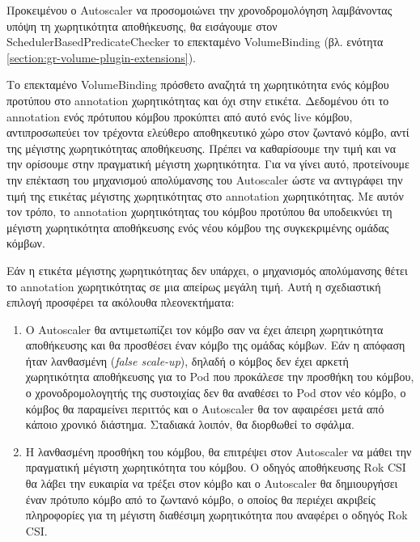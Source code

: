 Προκειμένου ο Autoscaler να προσομοιώνει την χρονοδρομολόγηση λαμβάνοντας υπόψη
τη χωρητικότητα αποθήκευσης,  θα εισάγουμε στον SchedulerBasedPredicateChecker
το επεκταμένο VolumeBinding (βλ. ενότητα
\ref*{section:gr-volume-plugin-extensions}).


Το επεκταμένο VolumeBinding  πρόσθετο αναζητά τη χωρητικότητα ενός κόμβου
προτύπου στο annotation χωρητικότητας και όχι στην ετικέτα. Δεδομένου ότι το
annotation ενός πρότυπου κόμβου προκύπτει από αυτό ενός live κόμβου,
αντιπροσωπεύει τον τρέχοντα ελεύθερο αποθηκευτικό χώρο στον ζωντανό κόμβο, αντί
της μέγιστης χωρητικότητας αποθήκευσης. Πρέπει να καθαρίσουμε την τιμή και να
την ορίσουμε στην πραγματική μέγιστη χωρητικότητα. Για να γίνει αυτό,
προτείνουμε την επέκταση του μηχανισμού απολύμανσης του Autoscaler ώστε να αντιγράφει
την τιμή της ετικέτας μέγιστης χωρητικότητας στο annotation χωρητικότητας. Με
αυτόν τον τρόπο, το annotation χωρητικότητας του κόμβου προτύπου θα
υποδεικνύει τη μέγιστη χωρητικότητα αποθήκευσης ενός νέου κόμβου της
συγκεκριμένης ομάδας κόμβων.

Εάν η ετικέτα μέγιστης χωρητικότητας δεν υπάρχει, ο μηχανισμός απολύμανσης θέτει
το annotation χωρητικότητας σε μια απείρως μεγάλη τιμή. Αυτή η σχεδιαστική
επιλογή προσφέρει τα ακόλουθα πλεονεκτήματα:
\begin{enumerate}
      \item Ο Autoscaler θα αντιμετωπίζει τον κόμβο σαν να έχει άπειρη χωρητικότητα
            αποθήκευσης και θα προσθέσει έναν κόμβο της ομάδας κόμβων. Εάν η
            απόφαση ήταν λανθασμένη (\textit{false scale-up}), δηλαδή ο κόμβος
            δεν έχει αρκετή χωρητικότητα αποθήκευσης για το Pod που
            προκάλεσε την προσθήκη του κόμβου, ο χρονοδρομολογητής της συστοιχίας
            δεν θα αναθέσει το Pod στον νέο κόμβο, ο κόμβος θα παραμείνει
            περιττός και ο Autoscaler θα τον αφαιρέσει μετά από κάποιο χρονικό
            διάστημα. Σταδιακά λοιπόν, θα διορθωθεί το σφάλμα.
      \item Η λανθασμένη προσθήκη του κόμβου, θα επιτρέψει στον Autoscaler να μάθει την
            πραγματική μέγιστη χωρητικότητα του κόμβου. Ο οδηγός αποθήκευσης Rok
            CSI θα λάβει την ευκαιρία να τρέξει στον κόμβο και ο Autoscaler θα
            δημιουργήσει έναν πρότυπο κόμβο από το ζωντανό κόμβο, ο οποίος θα
            περιέχει ακριβείς πληροφορίες για τη μέγιστη διαθέσιμη χωρητικότητα
            που αναφέρει ο οδηγός Rok CSI.
\end{enumerate}



